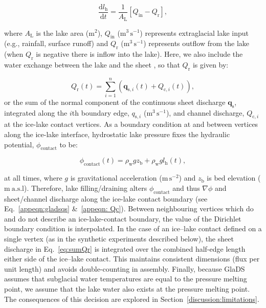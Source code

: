 \documentclass[tc, manuscript]{copernicus}
\begin{document}
\begin{equation}
\label{eq:lakecontinuity}
\frac{\mathrm{d} l_{\mathrm{h}}}{\mathrm{d} t} = \frac{1}{A_{\mathrm{L}}}[Q_{\mathrm{in}}-Q_{\mathrm{r}}],
\end{equation}

\noindent
where $A_\mathrm{L}$ is the lake area ($\mathrm{m}^2$), $Q_{\mathrm{in}}$ ($\mathrm{m}^3\, \mathrm{s}^{-1}$) represents extraglacial lake input (e.g., rainfall, surface runoff) and $Q_{\mathrm{r}}$ ($\mathrm{m}^3\, \mathrm{s}^{-1}$) represents outflow from the lake (when $Q_{\mathrm{r}}$ is negative there is inflow into the lake). Here, we also include the water exchange between the lake and the sheet \citep[unlike][who isolated cavities from the lake]{kingslake2013modelling}, so that $Q_{\mathrm{r}}$ is given by:

\begin{equation}
\label{eq:sumQr}
Q_{\mathrm{r}}(t) = \sum_{i=1}^{n} \left( \mathbf{q}_{\mathrm{s},i}(t) + Q_{\mathrm{c},i}(t) \right),
\end{equation}
\noindent
or the sum of the normal component of the continuous sheet discharge $\mathbf{q}_{\mathrm{s}}$, integrated along the $i$th boundary edge, $q_{\mathrm{s},i}$  ($\mathrm{m}^{3}\, \mathrm{s}^{-1}$), and channel discharge, $Q_{\mathrm{c},i}$ at the ice-lake contact vertices. As a boundary condition at and between vertices along the ice-lake interface, hydrostatic lake pressure fixes the hydraulic potential, $\phi_{\mathrm{contact}}$ to be: 

\begin{equation}
\label{eq:lakephi}
\phi_{\mathrm{contact}}(t) = \rho_{\mathrm{w}}gz_{\mathrm{b}} + \rho_{\mathrm{w}}gl_{\mathrm{h}}(t) ,
\end{equation}

at all times, where $g$ is gravitational acceleration ($\mathrm{m}\,\mathrm{s}^{-2}$) and $z_{\mathrm{b}}$ is bed elevation ($\mathrm{m \ a.s.l}$). Therefore, lake filling/draining alters $\phi_{\mathrm{contact}}$ and thus $\nabla \phi$ and sheet/channel discharge along the ice-lake contact boundary (see Eq.~\ref{appeqn:gladsqs} \&~\ref{appeqn: Qc}). Between neighbouring vertices which do and do not describe an ice-lake-contact boundary, the value of the Dirichlet boundary condition is interpolated. In the case of an ice--lake contact defined on a single vertex (as in the synthetic experiments described below), the sheet discharge in Eq.~\ref{eq:sumQr} is integrated over the combined half-edge length either side of the ice--lake contact. This maintains consistent dimensions (flux per unit length) and avoids double-counting in assembly. Finally, because GlaDS assumes that subglacial water temperatures are equal to the pressure melting point, we assume that the lake water also exists at the pressure melting point. The consequences of this decision are explored in Section~\ref{discussion:limitations}.
\end{document}
